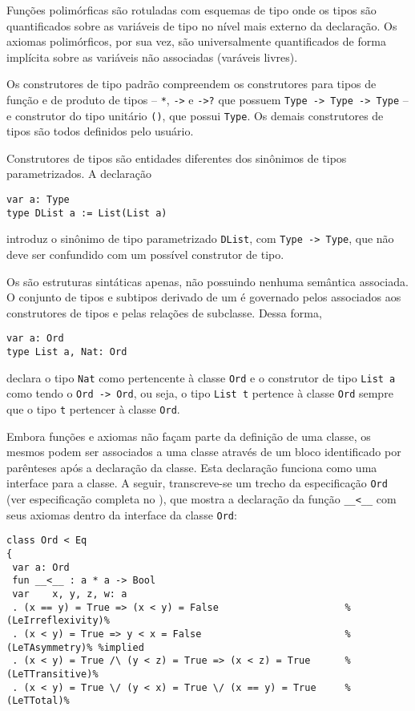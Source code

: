 Funções polimórficas são rotuladas com esquemas de tipo onde os tipos são quantificados sobre as variáveis de tipo no nível mais externo da declaração.
Os axiomas polimórficos, por sua vez, são universalmente quantificados de forma implícita sobre as variáveis não associadas (varáveis livres).

Os construtores de tipo padrão compreendem os construtores para tipos de função e de produto de tipos -- \Verb.*., \Verb.->. e \Verb.->?. que possuem \kind \Verb.Type -> Type -> Type. -- e construtor do tipo unitário \Verb.()., que possui \kind \Verb.Type..
Os demais construtores de tipos são todos definidos pelo usuário.

Construtores de tipos são entidades diferentes dos sinônimos de tipos parametrizados.
A declaração
\begin{Verbatim}
var a: Type
type DList a := List(List a)
\end{Verbatim}
introduz o sinônimo de tipo parametrizado \Verb.DList., com \kind \Verb.Type -> Type., que não deve ser confundido com um possível construtor de tipo.

Os \kinds são estruturas sintáticas apenas, não possuindo nenhuma semântica associada.
O conjunto de tipos e subtipos derivado de um \kind é governado pelos \kinds associados aos construtores de tipos e pelas relações de subclasse.
Dessa forma,
\begin{Verbatim}
var a: Ord
type List a, Nat: Ord
\end{Verbatim}
declara o tipo \Verb.Nat. como pertencente à classe \Verb.Ord. e o construtor de tipo \Verb.List a. como tendo o \kind \Verb.Ord -> Ord., ou seja, o tipo \Verb.List t. pertence à classe \Verb.Ord. sempre que o tipo \Verb.t. pertencer à classe \Verb.Ord..

Embora funções e axiomas não façam parte da definição de uma classe, os mesmos podem ser associados a uma classe através de um bloco identificado por parênteses após a declaração da classe.
Esta declaração funciona como uma interface para a classe.
A seguir, transcreve-se um trecho da especificação \Verb.Ord. (ver especificação completa no ), que mostra a declaração da função \Verb.__<__. com seus axiomas dentro da interface da classe \Verb.Ord.:
\begin{Verbatim}
class Ord < Eq
{
 var a: Ord
 fun __<__ : a * a -> Bool
 var    x, y, z, w: a
 . (x == y) = True => (x < y) = False                      %(LeIrreflexivity)%
 . (x < y) = True => y < x = False                         %(LeTAsymmetry)% %implied
 . (x < y) = True /\ (y < z) = True => (x < z) = True      %(LeTTransitive)%
 . (x < y) = True \/ (y < x) = True \/ (x == y) = True     %(LeTTotal)%
\end{Verbatim}

